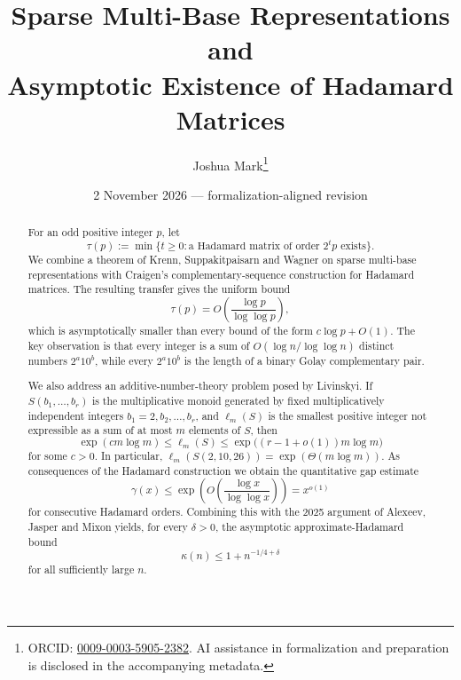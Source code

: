 \documentclass[11pt]{article}
\title{\textbf{Sparse Multi-Base Representations and\\Asymptotic Existence of Hadamard Matrices}}
\author{Joshua Mark\thanks{ORCID: \href{https://orcid.org/0009-0003-5905-2382}{0009-0003-5905-2382}. AI assistance in formalization and preparation is disclosed in the accompanying metadata.}}
\date{2 November 2026 --- formalization-aligned revision}
\begin{document}
\maketitle

\begin{abstract}
For an odd positive integer $p$, let
\[
\tau(p):=\min\{t\ge 0: \text{a Hadamard matrix of order }2^t p\text{ exists}\}.
\]
We combine a theorem of Krenn, Suppakitpaisarn and Wagner on sparse multi-base representations with Craigen's complementary-sequence construction for Hadamard matrices.  The resulting transfer gives the uniform bound
\[
\tau(p)=O\!\left(\frac{\log p}{\log\log p}\right),
\]
which is asymptotically smaller than every bound of the form $c\log p+O(1)$.  The key observation is that every integer is a sum of $O(\!\log n/\log\log n)$ distinct numbers $2^a10^b$, while every $2^a10^b$ is the length of a binary Golay complementary pair.

We also address an additive-number-theory problem posed by Livinskyi.  If $S(b_1,\ldots,b_r)$ is the multiplicative monoid generated by fixed multiplicatively independent integers $b_1=2,b_2,\ldots,b_r$, and $\ell_m(S)$ is the smallest positive integer not expressible as a sum of at most $m$ elements of $S$, then
\[
\exp(c m\log m)\le \ell_m(S)\le
\exp\bigl((r-1+o(1))m\log m\bigr)
\]
for some $c>0$.  In particular,
$\ell_m(S(2,10,26))=\exp(\Theta(m\log m))$.
As consequences of the Hadamard construction we obtain the quantitative gap estimate
\[
\gamma(x)\le \exp\!\left(O\!\left(\frac{\log x}{\log\log x}\right)\right)=x^{o(1)}
\]
for consecutive Hadamard orders.  Combining this with the 2025 argument of Alexeev, Jasper and Mixon yields, for every $\delta>0$, the asymptotic approximate-Hadamard bound
\[
\kappa(n)\le 1+n^{-1/4+\delta}
\]
for all sufficiently large $n$.
\end{abstract}

\noindent{}
\end{document}
